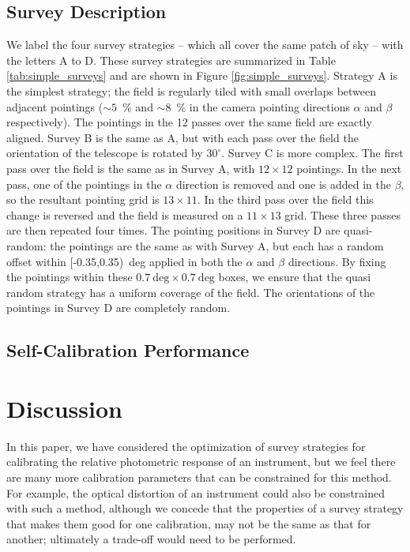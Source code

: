 \documentclass[manuscript]{aastex}
\begin{document}
\subsection{Survey Description}
We label the four survey strategies -- which all cover the same patch of sky -- with the letters A to D. These survey strategies are summarized in Table \ref{tab:simple_surveys} and are shown in Figure \ref{fig:simple_surveys}. Strategy A is the simplest strategy; the field is regularly tiled with small overlaps between adjacent pointings ($\sim 5$~\% and $\sim 8$~\% in the camera pointing directions $\alpha$ and $\beta$ respectively). The pointings in the 12 passes over the same field are exactly aligned. Survey B is the same as A, but with each pass over the field the orientation of the telescope is rotated by $30^\circ$. Survey C is more complex. The first pass over the field is the same as in Survey A, with $12 \times 12$ pointings. In the next pass, one of the pointings in the $\alpha$ direction is removed and one is added in the $\beta$, so the resultant pointing grid is $13 \times 11$. In the third pass over the field this change is reversed and the field is measured on a $11 \times 13$ grid. These three passes are then repeated four times. The pointing positions in Survey D are quasi-random: the pointings are the same as with Survey A, but each has a random offset within [-0.35,0.35)~deg applied in both the $\alpha$ and $\beta$ directions. By fixing the pointings within these $0.7~\text{deg} \times 0.7~\text{deg}$ boxes, we ensure that the quasi random strategy has a uniform coverage of the field. The orientations of the pointings in Survey D are completely random.

\subsection{Self-Calibration Performance}

\section{Discussion}
In this paper, we have considered the optimization of survey strategies for calibrating the relative photometric response of an instrument, but we feel there are many more calibration parameters that can be constrained for this method. For example, the optical distortion of an instrument could also be constrained with such a method, although we concede that the properties of a survey strategy that makes them good for one calibration, may not be the same as that for another; ultimately a trade-off would need to be performed. 
\end{document}
